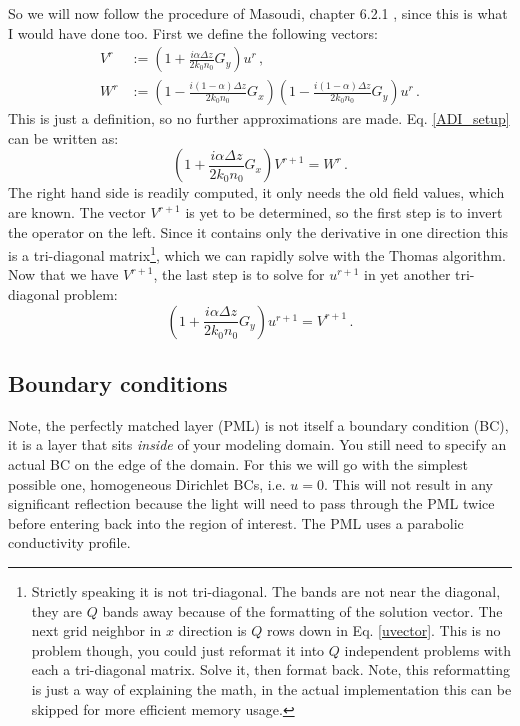 \documentclass[]{article}
\begin{document}
	So we will now follow the procedure of Masoudi, chapter 6.2.1 \cite{masoudi1995parallel}, since this is what I would have done too. First we define the following vectors:
	\begin{subequations}
		\begin{align}
			V^r &:= \left(1+\frac{i\alpha \Delta z}{2k_0 n_0}G_y \right) u^r\, ,\\
			W^r &:= \left(1-\frac{i(1-\alpha) \Delta z}{2k_0 n_0}G_x \right)\left(1-\frac{i(1-\alpha) \Delta z}{2k_0 n_0}G_y \right) u^r \, .
		\end{align}
	\end{subequations}
	This is just a definition, so no further approximations are made. Eq. \eqref{ADI_setup} can be written as:
	\begin{equation}
		\left(1+\frac{i\alpha \Delta z}{2k_0 n_0}G_x \right) V^{r+1} = W^r\, .
	\end{equation}
	The right hand side is readily computed, it only needs the old field values, which are known. The vector $V^{r+1}$ is yet to be determined, so the first step is to invert the operator on the left. Since it contains only the derivative in one direction this is a tri-diagonal matrix\footnote{Strictly speaking it is not tri-diagonal. The bands are not near the diagonal, they are $Q$ bands away because of the formatting of the solution vector. The next grid neighbor in $x$ direction is $Q$ rows down in Eq. \eqref{uvector}. This is no problem though, you could just reformat it into $Q$ independent problems with each a tri-diagonal matrix. Solve it, then format back. Note, this reformatting is just a way of explaining the math, in the actual implementation this can be skipped for more efficient memory usage.}, which we can rapidly solve with the Thomas algorithm. Now that we have $V^{r+1}$, the last step is to solve for $u^{r+1}$ in yet another tri-diagonal problem:
	\begin{equation}
		\left(1+\frac{i\alpha \Delta z}{2k_0 n_0}G_y \right) u^{r+1} = V^{r+1}\, .
	\end{equation}
	
	\subsection{Boundary conditions}
	\label{BC_section}	
	Note, the perfectly matched layer (PML) is not itself a boundary condition (BC), it is a layer that sits \textit{inside} of your modeling domain. You still need to specify an actual BC on the edge of the domain. For this we will go with the simplest possible one, homogeneous Dirichlet BCs, i.e. $u=0$. This will not result in any significant reflection because the light will need to pass through the PML twice before entering back into the region of interest. The PML uses a parabolic conductivity profile.\\
	
\end{document}
